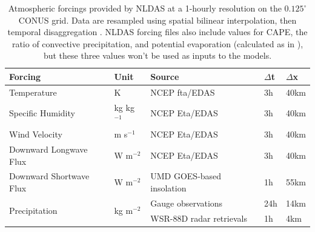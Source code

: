 \documentclass[11pt]{article}
\begin{document}
\begin{table}[h!]\label{forcings}
    \centering
    \begin{tabular}{ l l l l l}
        Forcing & Unit & Source & $\Delta$t & $\Delta$x \\
        \hline
        Temperature & K & NCEP fta/EDAS & 3h & 40km \\
        Specific Humidity & kg kg$^{-1}$ & NCEP Eta/EDAS & 3h & 40km \\
        Wind Velocity & m s$^{-1}$ & NCEP Eta/EDAS & 3h & 40km \\
        Downward Longwave Flux & W m$^{-2}$ & NCEP Eta/EDAS & 3h & 40km \\
        Downward Shortwave Flux & W m$^{-2}$ & UMD GOES-based insolation & 1h & 55km \\
        \multirow{2}{*}{Precipitation} & \multirow{2}{*}{kg m$^{-2}$} & Gauge observations & 24h & 14km \\
        & & WSR-88D radar retrievals & 1h & 4km \\
    \end{tabular}

    \caption{Atmospheric forcings provided by NLDAS at a 1-hourly resolution on the $0.125^\circ$ CONUS grid. Data are resampled using spatial bilinear interpolation, then temporal disaggregation \cite{mitchell_multi-institution_2004}. NLDAS forcing files also include values for CAPE, the ratio of convective precipitation, and potential evaporation (calculated as in \cite{mahrt_influence_1984}), but these three values won't be used as inputs to the models.}

\end{table}

\vspace{-1.2em}
\end{document}
